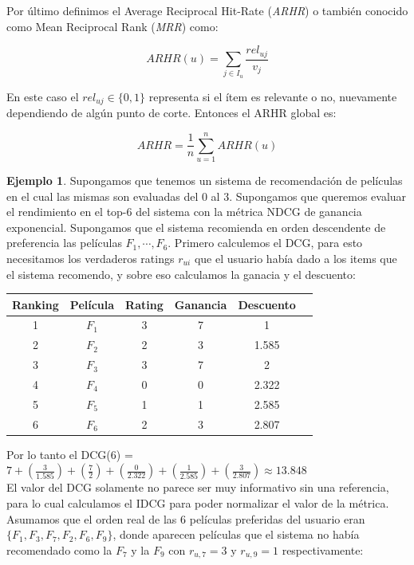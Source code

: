\documentclass[hidelinks,12pt,a4paper]{book}
\theoremstyle{plain}
\theoremstyle{definition}
\newtheorem{ejemplo}{{\textbf{Ejemplo}}}[chapter]
\begin{document}
Por último  definimos el Average Reciprocal Hit-Rate (\textit{ARHR}) o también conocido como Mean Reciprocal Rank (\textit{MRR}) como:

\begin{equation}
ARHR(u) = \sum_{j \in I_u} \frac{rel_{uj}}{v_j} 
\end{equation}

En este caso el $rel_{uj}\in \{0,1\}$ representa si el ítem es relevante o no, nuevamente dependiendo de algún punto de corte. Entonces el ARHR global es:

\begin{equation}
ARHR = \frac{1}{n}{\sum_{u=1}^{n} ARHR(u)}
\end{equation}

\begin{ejemplo}
Supongamos que tenemos un sistema de recomendación de películas en el cual las mismas son evaluadas del 0 al 3. Supongamos que queremos evaluar el rendimiento en el top-6 del sistema con la métrica NDCG de ganancia exponencial. Supongamos que el sistema recomienda en orden descendente de preferencia las películas $F_1,\cdots,F_6$. Primero calculemos el DCG, para esto necesitamos los verdaderos ratings $r_{ui}$ que el usuario había dado a los items que el sistema recomendo, y sobre eso calculamos la ganacia y el descuento:

\begin{center}
\begin{tabular}{|c|c|c|c|c|c|}
\hline
Ranking & Película & Rating & Ganancia & Descuento \\
\hline
1 & $F_1$ & 3 & 7 & 1  \\
\hline
2 & $F_2$ & 2 & 3 & 1.585  \\
\hline
3 & $F_3$ & 3 & 7 & 2 \\
\hline
4 & $F_4$ & 0 & 0 & 2.322  \\
\hline
5 & $F_5$ & 1 & 1 & 2.585  \\
\hline
6 & $F_6$ & 2 & 3 & 2.807  \\
\hline
\end{tabular}
\end{center}

Por lo tanto el DCG(6) = $7+(\frac{3}{1.585})+(\frac{7}{2})+(\frac{0}{2.322})+(\frac{1}{2.585})+(\frac{3}{2.807})\approx 13.848$\\
El valor del DCG solamente no parece ser muy informativo sin una referencia, para lo cual calculamos el IDCG para poder normalizar el valor de la métrica. Asumamos que el orden real de las 6 películas preferidas del usuario eran $\{F_1,F_3,F_7,F_2,F_6,F_9\}$, donde aparecen películas que el sistema no había recomendado como la $F_7$ y la $F_9$ con $r_{u,7}=3$ y $r_{u,9}=1$ respectivamente:


\end{ejemplo}
\end{document}
